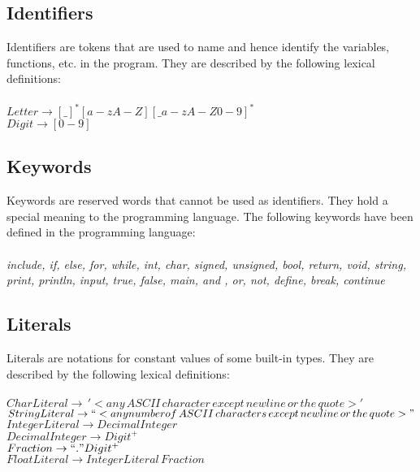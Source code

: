 \documentclass[12pt, a4paper]{article}
\begin{document}
		\subsection{Identifiers}
			Identifiers are tokens that are used to name and hence identify the variables, functions, etc. in the program.  They are described by the following lexical definitions: \\ \\
			$ Letter \to [\_]^*[a-zA-Z][\_a-zA-Z0-9]^* $ \\
			$ Digit \to [0-9]$ \\
		
		\subsection{Keywords}
			Keywords are reserved words that cannot be used as identifiers. They hold a special meaning to the programming language. The following keywords have been defined in the programming language:  \\ \\
			 \textit{include, if, else, for, while, int, char, signed, unsigned, bool, return, void, string, print, println, input, true, false, main, and , or, not, define, break, continue}
			 
	 	\subsection{Literals}
	 		Literals are notations for constant values of some built-in types. They are described by the following lexical definitions: \\ \\
	 		$CharLiteral \to \,'<any \, ASCII \, character \, except \, newline \, or \, the \, quote>' $ \\
	 		$ StringLiteral \to  ``<any  number of \, ASCII \, characters \, except \, newline \, or \, the \, quote>" $ \\
	 		$ IntegerLiteral \to DecimalInteger $ \\
	 		$ DecimalInteger \to Digit^+ $ \\
	 		$ Fraction\to``." Digit^+ $ \\
	 		$ FloatLiteral \to IntegerLiteral \, Fraction $ 
	 		
\end{document}
